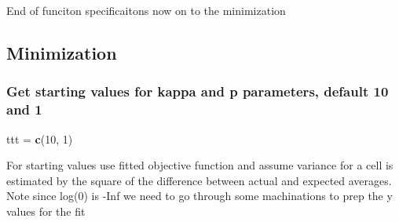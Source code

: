 \documentclass[]{article}
\newenvironment{Shaded}{\begin{snugshade}}{\end{snugshade}}
\newcommand{\CommentTok}[1]{\textcolor[rgb]{0.56,0.35,0.01}{\textit{#1}}}
\newcommand{\DataTypeTok}[1]{\textcolor[rgb]{0.13,0.29,0.53}{#1}}
\newcommand{\DecValTok}[1]{\textcolor[rgb]{0.00,0.00,0.81}{#1}}
\newcommand{\KeywordTok}[1]{\textcolor[rgb]{0.13,0.29,0.53}{\textbf{#1}}}
\newcommand{\NormalTok}[1]{#1}
\newcommand{\OperatorTok}[1]{\textcolor[rgb]{0.81,0.36,0.00}{\textbf{#1}}}
\newcommand{\StringTok}[1]{\textcolor[rgb]{0.31,0.60,0.02}{#1}}
\begin{document}
End of funciton specificaitons now on to the minimization

\hypertarget{minimization}{%
\subsection{Minimization}\label{minimization}}

\hypertarget{get-starting-values-for-kappa-and-p-parameters-default-10-and-1}{%
\subsubsection{Get starting values for kappa and p parameters, default
10 and
1}\label{get-starting-values-for-kappa-and-p-parameters-default-10-and-1}}

\begin{Shaded}
\begin{Highlighting}[]
\NormalTok{ttt =}\StringTok{ }\KeywordTok{c}\NormalTok{(}\DecValTok{10}\NormalTok{, }\DecValTok{1}\NormalTok{)}
\end{Highlighting}
\end{Shaded}

For starting values use fitted objective function and assume variance
for a cell is estimated by the square of the difference between actual
and expected averages. Note since log(0) is -Inf we need to go through
some machinations to prep the y values for the fit

\begin{Shaded}
\end{Shaded}
\end{document}
